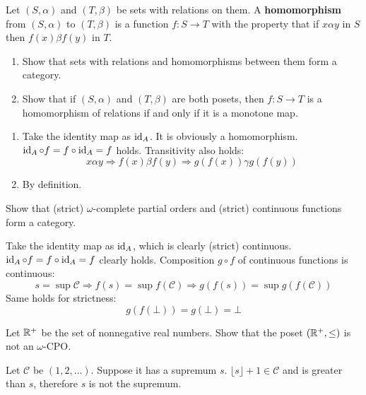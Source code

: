 \begin{exercise}
    Let \((S, \alpha)\) and \((T, \beta)\) be sets with relations on them. A \textbf{homomorphism} from \((S, \alpha)\) to \((T, \beta)\) is a function \(f : S \to T\) with the property that if \(x \alpha y\) in \(S\) then \(f(x) \beta f(y)\) in \(T\).
    \begin{enumerate}
        \item Show that sets with relations and homomorphisms between them form a category.
        \item Show that if \((S, \alpha)\) and \((T, \beta)\) are both posets, then \(f : S \to T\) is a homomorphism of relations if and only if it is a monotone map.
    \end{enumerate}
\end{exercise}
\begin{solution}\itemfix
    \begin{enumerate}
        \item Take the identity map as \(\operatorname{id}_A\). It is obviously a homomorphism. \(\operatorname{id}_A \circ f = f \circ \operatorname{id}_A = f\) holds. Transitivity also holds:
              \[x \alpha y \Rightarrow f(x) \beta f(y) \Rightarrow g(f(x)) \gamma g(f(y))\]
        \item By definition.
    \end{enumerate}
\end{solution}

\begin{exercise}
    Show that (strict) \(\omega\)-complete partial orders and (strict) continuous functions form a category.
\end{exercise}
\begin{solution}
    Take the identity map as \(\operatorname{id}_A\), which is clearly (strict) continuous. \(\operatorname{id}_A \circ f = f \circ \operatorname{id}_A = f\) clearly holds. Composition \(g \circ f\) of continuous functions is continuous:
    \[s = \sup \mathcal{C} \Rightarrow f(s) = \sup f(\mathcal{C}) \Rightarrow g(f(s)) = \sup g(f(\mathcal{C}))\]
    Same holds for strictness:
    \[g(f(\bot)) = g(\bot) = \bot\]
\end{solution}

\begin{exercise}
    Let \(\mathbb{R}^+\) be the set of nonnegative real numbers. Show that the poset \((\mathbb{R}^+ , \leq)\) is not an \(\omega\)-CPO.
\end{exercise}
\begin{solution}
    Let \(\mathcal{C}\) be \((1, 2, \dots )\). Suppose it has a supremum \(s\). \(\lfloor s \rfloor + 1 \in \mathcal{C}\) and is greater than \(s\), therefore \(s\) is not the supremum.
\end{solution}


